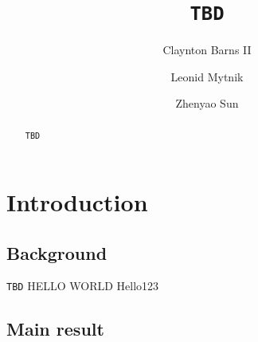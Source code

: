 \documentclass[12pt,a4paper]{amsart}
\numberwithin{equation}{section}
\theoremstyle{plain}
\theoremstyle{remark}
\begin{document}
	\title[]{{\tt TBD}}
	\author[]{Claynton Barns II}
	\address{{\tt TBD}}
	\author[]{Leonid Mytnik}
	\address{{\tt TBD}}
	\author[]{Zhenyao Sun}
	\address{{\tt TBD}}
\begin{abstract}
	{\tt TBD}
\end{abstract}
\maketitle
	
\section{Introduction}
\subsection{Background} 
    {\tt TBD}
    {HELLO WORLD}
    Hello123
   
\subsection{Main result} \label{sec:M} 
\end{document}
